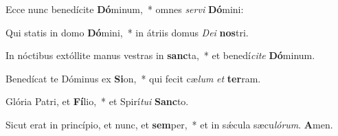 \item Ecce nunc benedícite \textbf{Dó}minum,~* omnes \textit{servi} \textbf{Dó}mini:

\item Qui statis in domo \textbf{Dó}mini,~* in átriis domus \textit{Dei} \textbf{nos}tri.

\item In nóctibus extóllite manus vestras in \textbf{sanc}ta,~* et benedí\textit{cite} \textbf{Dó}minum.

\item Benedícat te Dóminus ex \textbf{Si}on,~* qui fecit cæ\textit{lum} \textit{et} \textbf{ter}ram.

\item Glória Patri, et \textbf{Fí}lio,~* et Spirí\textit{tui} \textbf{Sanc}to.

\item Sicut erat in princípio, et nunc, et \textbf{sem}per,~* et in sǽcula sæcu\textit{lórum}. \textbf{A}men.

